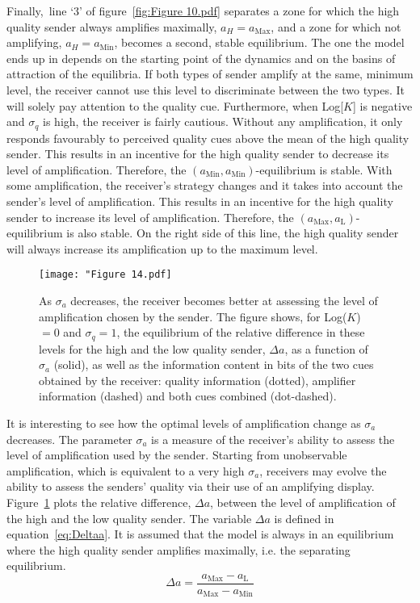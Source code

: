 \documentclass[a4paper,12pt]{article}
\numberwithin{equation}{section}
\numberwithin{figure}{section}
\begin{document}
Finally,~line `3' of figure~\ref{fig:Figure 10.pdf} separates a zone for which the high quality sender always amplifies maximally, $a_{H}=a_{\text{Max}}$, and a zone for which not amplifying, $a_{H}=a_{\text{Min}}$, becomes a second, stable equilibrium. The one the model ends up in depends on the starting point of the dynamics and on the basins of attraction of the equilibria. If both types of sender amplify at the same, minimum level, the receiver cannot use this level to discriminate between the two types. It will solely pay attention to the quality cue. Furthermore, when Log[$K$] is negative and $\sigma_{q}$ is high, the receiver is fairly cautious. Without any amplification, it only responds favourably to perceived quality cues above the mean of the high quality sender. This results in an incentive for the high quality sender to decrease its level of amplification. Therefore, the $(a_{\text{Min}},a_{\text{Min}})$-equilibrium is stable. With some amplification, the receiver's strategy changes and it takes into account the sender's level of amplification. This results in an incentive for the high quality sender to increase its level of amplification. Therefore, the $(a_{\text{Max}},a_{\text{L}})$-equilibrium is also stable. On the right side of this line, the high quality sender will always increase its amplification up to the maximum level.

\begin{figure}[!h]
\captionsetup{width=350pt}
\begin{center}
\leavevmode
\texttt{[image: "Figure 14.pdf]}
\caption[Optimal levels of amplification for a high and a low quality sender]{As $\sigma_{a}$ decreases, the receiver becomes better at assessing the level of amplification chosen by the sender. The figure shows, for Log($K$)$=0$ and $\sigma_{q}=1$, the equilibrium of the relative difference in these levels for the high and the low quality sender, $\Delta a$, as a function of $\sigma_{a}$ (solid), as well as the information content in bits of the two cues obtained by the receiver: quality information (dotted), amplifier information (dashed) and both cues combined (dot-dashed).}
\label{fig:Figure 14.pdf}
\end{center}
\end{figure}

It is interesting to see how the optimal levels of amplification change as $\sigma_{a}$ decreases. The parameter $\sigma_{a}$ is a measure of the receiver's ability to assess the level of amplification used by the sender. Starting from unobservable amplification, which is equivalent to a very high $\sigma_{a}$, receivers may evolve the ability to assess the senders' quality via their use of an amplifying display. Figure~\ref{fig:Figure 14.pdf} plots the relative difference, $\Delta a$, between the level of amplification of the high and the low quality sender. The variable $\Delta a$ is defined in equation~\ref{eq:Deltaa}. It is assumed that the model is always in an equilibrium where the high quality sender amplifies maximally, i.e. the separating equilibrium.
\begin{equation}
\label{eq:Deltaa}
\Delta a = \frac{a_{\text{Max}}-a_{\text{L}}}{a_{\text{Max}}-a_{\text{Min}}}
\end{equation}
\end{document}
